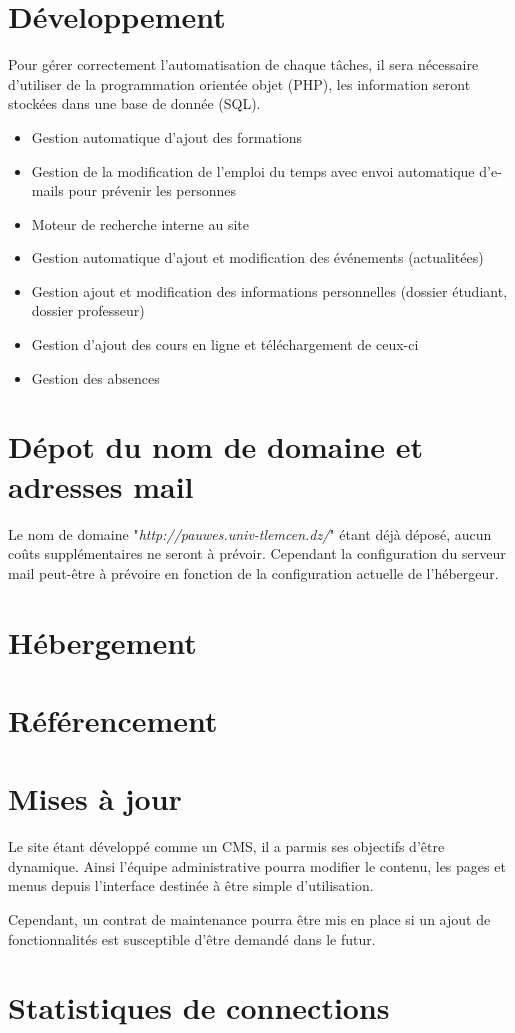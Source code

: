 \documentclass[oneside]{report}
\begin{document}
{		\section{Développement}
		\par Pour gérer correctement l’automatisation de chaque tâches, il sera nécessaire d’utiliser de la programmation orientée objet (PHP), les information seront stockées dans une base de donnée (SQL).
		\par
		\begin{itemize}
			\item Gestion automatique d’ajout des formations
			\item Gestion de la modification de l’emploi du temps avec envoi automatique d'e-mails pour prévenir les personnes
			\item Moteur de recherche interne au site
			\item Gestion automatique d’ajout et modification des événements (actualitées)
			\item Gestion ajout et modification des informations personnelles (dossier étudiant, dossier professeur)
			\item Gestion d’ajout des cours en ligne et téléchargement de ceux-ci
			\item Gestion des absences
		\end{itemize}
		\section{Dépot du nom de domaine et adresses mail}
		{
			\par Le nom de domaine "\textit{http://pauwes.univ-tlemcen.dz/}" étant déjà déposé, aucun coûts supplémentaires ne seront à prévoir. Cependant la configuration du serveur mail peut-être à prévoire en fonction de la configuration actuelle de l'hébergeur.
		}
		\section{Hébergement}
		\section{Référencement}
		\section{Mises à jour}
		{
			\par Le site étant développé comme un CMS, il a parmis ses objectifs d’être dynamique. Ainsi l’équipe administrative pourra modifier le contenu, les pages et menus depuis l’interface destinée à être simple d’utilisation.
			\par Cependant, un contrat de maintenance pourra être mis en place si un ajout de fonctionnalités est susceptible d’être demandé dans le futur.
		}
		\section{Statistiques de connections}
	}
\end{document}
